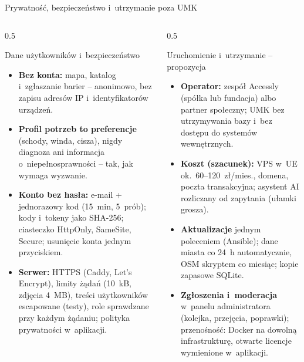 \begin{frame}{Prywatność, bezpieczeństwo i~utrzymanie poza UMK}
  \begin{columns}[T,onlytextwidth]
    \begin{column}{0.5\textwidth}
      \begin{block}{Dane użytkowników i~bezpieczeństwo}
        \footnotesize
        \begin{itemize}
          \item \textbf{Bez konta:} mapa, katalog i~zgłaszanie barier -- anonimowo, bez zapisu adresów IP
                i~identyfikatorów urządzeń.
          \item \textbf{Profil potrzeb to preferencje} (schody, winda, cisza), nigdy diagnoza ani informacja
                o~niepełnosprawności -- tak, jak wymaga wyzwanie.
          \item \textbf{Konto bez hasła:} e-mail + jednorazowy kod (15~min, 5~prób); kody i~tokeny jako SHA-256;
                ciasteczko HttpOnly, SameSite, Secure; usunięcie konta jednym przyciskiem.
          \item \textbf{Serwer:} HTTPS (Caddy, Let's Encrypt), limity żądań (10~kB, zdjęcia 4~MB), treści użytkowników
                escapowane (testy), role sprawdzane przy każdym żądaniu; polityka prywatności w~aplikacji.
        \end{itemize}
      \end{block}
    \end{column}
    \begin{column}{0.5\textwidth}
      \begin{block}{Uruchomienie i~utrzymanie -- propozycja}
        \footnotesize
        \begin{itemize}
          \item \textbf{Operator:} zespół Accessly (spółka lub fundacja) albo partner społeczny; UMK bez
                utrzymywania bazy i~bez dostępu do systemów wewnętrznych.
          \item \textbf{Koszt (szacunek):} VPS w~UE ok.~60--120~zł/mies., domena, poczta transakcyjna;
                asystent AI rozliczany od zapytania (ułamki grosza).
          \item \textbf{Aktualizacje} jednym poleceniem (Ansible); dane miasta co 24~h automatycznie,
                OSM skryptem co miesiąc; kopie zapasowe SQLite.
          \item \textbf{Zgłoszenia i~moderacja} w~panelu administratora (kolejka, przejęcia, poprawki);
                przenośność: Docker na dowolną infrastrukturę, otwarte licencje wymienione w~aplikacji.
        \end{itemize}
      \end{block}
    \end{column}
  \end{columns}


\end{frame}
